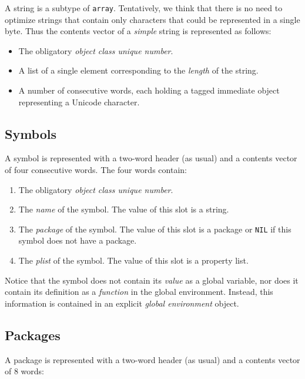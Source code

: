 A string is a subtype of \texttt{array}.  Tentatively, we think that
there is no need to optimize strings that contain only characters that
could be represented in a single byte.  Thus the contents vector of a
\emph{simple} string is represented as follows:

\begin{itemize}
\item The obligatory \emph{object class unique number}.
\item A list of a single element corresponding to the \emph{length} of
  the string. 
\item A number of consecutive words, each holding a tagged immediate
  object representing a Unicode character.
\end{itemize}

\subsection{Symbols}

A symbol is represented with a two-word header (as usual) and a
contents vector of four consecutive words.  The four words contain:

\begin{enumerate}
\item The obligatory \emph{object class unique number}.
\item The \emph{name} of the symbol.  The value of this slot is a
  string.
\item The \emph{package} of the symbol.  The value of this slot is a
  package or \texttt{NIL} if this symbol does not have a package.
\item The \emph{plist} of the symbol.  The value of this slot is a
  property list.
\end{enumerate}

Notice that the symbol does not contain its \emph{value} as a global
variable, nor does it contain its definition as a \emph{function} in
the global environment.  Instead, this information is contained in an
explicit \emph{global environment} object.

\subsection{Packages}

A package is represented with a two-word header (as usual) and a
contents vector of 8 words:


